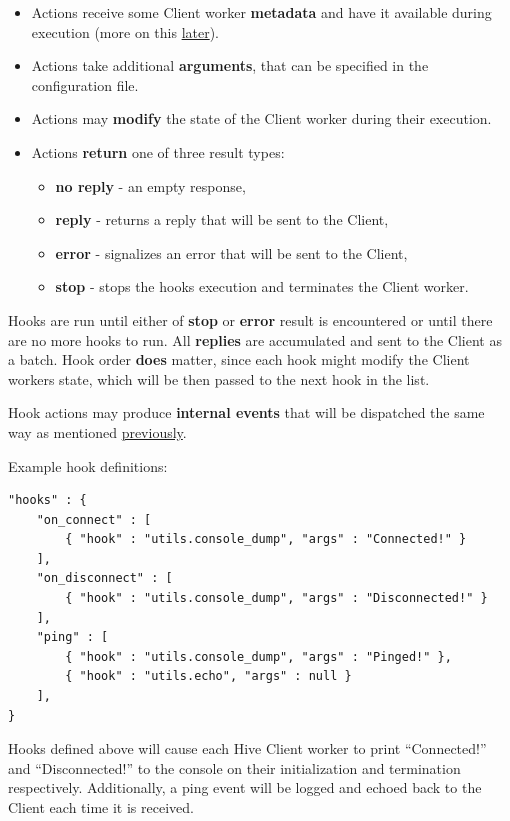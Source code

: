 \documentclass[a4paper]{article}
\begin{document}
\begin{itemize}
\begin{itemize}
\item Actions receive some Client worker \textbf{metadata} and have it available during execution (more on this \hyperref[sec-7-1-4-2]{later}).
\item Actions take additional \textbf{arguments}, that can be specified in the configuration file.
\item Actions may \textbf{modify} the state of the Client worker during their execution.
\item Actions \textbf{return} one of three result types:
\begin{itemize}
\item \textbf{no reply} - an empty response,
\item \textbf{reply} - returns a reply that will be sent to the Client,
\item \textbf{error} - signalizes an error that will be sent to the Client,
\item \textbf{stop} - stops the hooks execution and terminates the Client worker.
\end{itemize}
\end{itemize}

\noindent
Hooks are run until either of \textbf{stop} or \textbf{error} result is encountered or until there are no more hooks to run. All \textbf{replies} are accumulated and sent to the Client as a batch. Hook order \textbf{does} matter, since each hook might modify the Client workers state, which will be then passed to the next hook in the list.

\noindent
Hook actions may produce \textbf{internal events} that will be dispatched the same way as mentioned \hyperref[sec-8-3]{previously}.

\noindent
Example hook definitions:


\begin{verbatim}
"hooks" : {
    "on_connect" : [
        { "hook" : "utils.console_dump", "args" : "Connected!" }
    ],
    "on_disconnect" : [
        { "hook" : "utils.console_dump", "args" : "Disconnected!" }
    ],
    "ping" : [
        { "hook" : "utils.console_dump", "args" : "Pinged!" },
        { "hook" : "utils.echo", "args" : null }
    ],
}
\end{verbatim}




\noindent
Hooks defined above will cause each Hive Client worker to print ``Connected!'' and ``Disconnected!'' to the console on their initialization and termination respectively. Additionally, a ping event will be logged and echoed back to the Client each time it is received.



\end{itemize}
\end{document}
